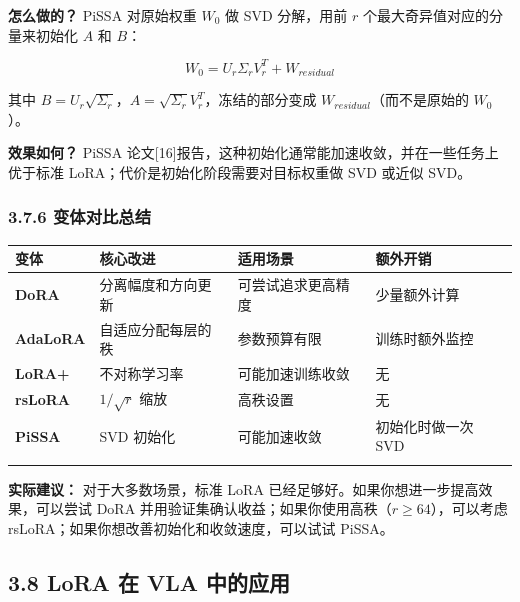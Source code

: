 \documentclass[
  chinese,
]{ctexart}
\begin{document}
\textbf{怎么做的？} PiSSA 对原始权重 \(W_0\) 做 SVD 分解，用前 \(r\)
个最大奇异值对应的分量来初始化 \(A\) 和 \(B\)：

\[W_0 = U_r \Sigma_r V_r^T + W_{residual}\]

其中
\(B = U_r \sqrt{\Sigma_r}\)，\(A = \sqrt{\Sigma_r} V_r^T\)，冻结的部分变成
\(W_{residual}\)（而不是原始的 \(W_0\)）。

\textbf{效果如何？} PiSSA
论文{[}16{]}报告，这种初始化通常能加速收敛，并在一些任务上优于标准
LoRA；代价是初始化阶段需要对目标权重做 SVD 或近似 SVD。

\subsubsection{3.7.6
变体对比总结}\label{ux53d8ux4f53ux5bf9ux6bd4ux603bux7ed3}

\begin{center}
\begin{tabular}{@{}>{\raggedright\arraybackslash}p{} >{\raggedright\arraybackslash}p{} >{\raggedright\arraybackslash}p{} >{\raggedright\arraybackslash}p{}@{}}
\toprule\noalign{}
变体 & 核心改进 & 适用场景 & 额外开销 \\
\midrule\noalign{}
\textbf{DoRA} & 分离幅度和方向更新 & 可尝试追求更高精度 & 少量额外计算 \\
\textbf{AdaLoRA} & 自适应分配每层的秩 & 参数预算有限 & 训练时额外监控 \\
\textbf{LoRA+} & 不对称学习率 & 可能加速训练收敛 & 无 \\
\textbf{rsLoRA} & \(1/\sqrt{r}\) 缩放 & 高秩设置 & 无 \\
\textbf{PiSSA} & SVD 初始化 & 可能加速收敛 & 初始化时做一次 SVD \\
\bottomrule\noalign{}
\end{tabular}
\end{center}

\textbf{实际建议：} 对于大多数场景，标准 LoRA
已经足够好。如果你想进一步提高效果，可以尝试 DoRA
并用验证集确认收益；如果你使用高秩（\(r \geq 64\)），可以考虑
rsLoRA；如果你想改善初始化和收敛速度，可以试试 PiSSA。

\subsection{3.8 LoRA 在 VLA
中的应用}\label{lora-ux5728-vla-ux4e2dux7684ux5e94ux7528}
\end{document}
